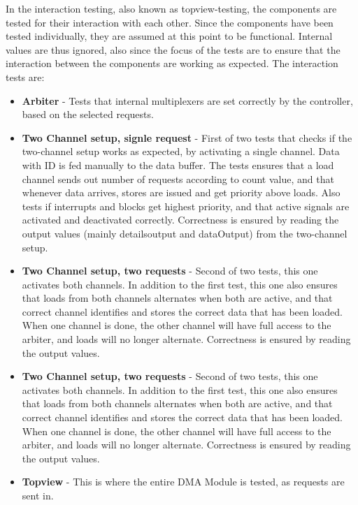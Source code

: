 \begin{appendix}
In the interaction testing, also known as topview-testing, the components are tested for their interaction with each other.
Since the components have been tested individually, they are assumed at this point to be functional. 
Internal values are thus ignored, also since the focus of the tests are to ensure that the interaction between the components are working as expected.
The interaction tests are:
\begin{itemize}
    \item \textbf{Arbiter} - Tests that internal multiplexers are set correctly by the controller, based on the selected requests.
    \item \textbf{Two Channel setup, signle request} - First of two tests that checks if the two-channel setup works as expected, by activating a single channel.
    Data with ID is fed manually to the data buffer.
    The tests ensures that a load channel sends out number of requests according to count value, and that whenever data arrives, stores are issued and get priority above loads.
    Also tests if interrupts and blocks get highest priority, and that active signals are activated and deactivated correctly.
    Correctness is ensured by reading the output values (mainly detailsoutput and dataOutput) from the two-channel setup.
    \item \textbf{Two Channel setup, two requests} - Second of two tests, this one activates both channels.
    In addition to the first test, this one also ensures that loads from both channels alternates when both are active, and that correct channel identifies and stores the correct data that has been loaded.
    When one channel is done, the other channel will have full access to the arbiter, and loads will no longer alternate.
    Correctness is ensured by reading the output values. 
    \item \textbf{Two Channel setup, two requests} - Second of two tests, this one activates both channels.
    In addition to the first test, this one also ensures that loads from both channels alternates when both are active, and that correct channel identifies and stores the correct data that has been loaded.
    When one channel is done, the other channel will have full access to the arbiter, and loads will no longer alternate.
    Correctness is ensured by reading the output values.
    \item \textbf{Topview} - This is where the entire DMA Module is tested, as requests are sent in.

\end{itemize}
\end{appendix}
